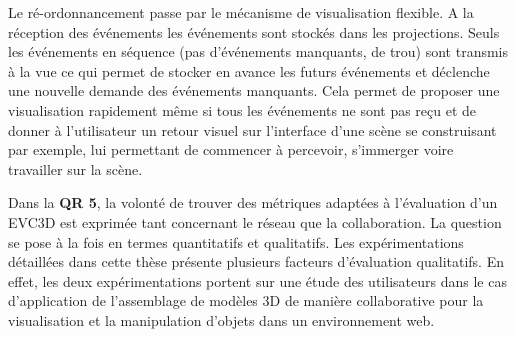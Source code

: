 Le ré-ordonnancement passe par le mécanisme de visualisation flexible. A la 
réception des événements les événements sont stockés dans les projections. 
Seuls les événements en séquence (pas d'événements manquants, de \og 
trou\fg{}) sont transmis à la vue ce qui permet de stocker en avance les futurs 
événements et déclenche une nouvelle demande des événements manquants. 
Cela permet de proposer une visualisation rapidement même si tous les 
événements ne sont pas reçu et de donner à l'utilisateur un retour visuel sur 
l'interface d'une scène se construisant par exemple, lui permettant de commencer 
à percevoir, s'immerger voire travailler sur la scène.


%
Dans la \textbf{QR 5}, la volonté de trouver des métriques adaptées à l'évaluation 
d'un \gls{EVC3D} est exprimée tant concernant le réseau que la collaboration. La 
question se pose à la fois en termes quantitatifs et qualitatifs.
Les expérimentations détaillées dans cette thèse présente plusieurs facteurs 
d'évaluation qualitatifs. En effet, les deux expérimentations portent sur une étude 
des utilisateurs dans le cas d'application de l'assemblage de modèles 3D de 
manière collaborative pour la visualisation et la manipulation d'objets dans un 
environnement web.



%
%
%
%
%
%
%
